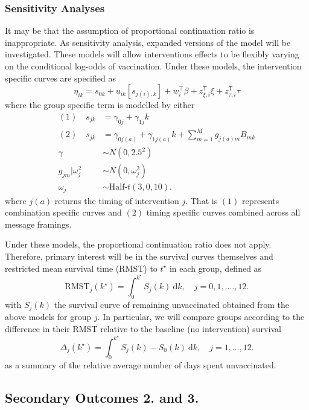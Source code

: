 \documentclass[
  bibliography=totoc]{scrreprt}
\begin{document}
\hypertarget{sensitivity-analyses}{%
\subsubsection{Sensitivity Analyses}\label{sensitivity-analyses}}

It may be that the assumption of proportional continuation ratio is inappropriate.
As sensitivity analysis, expanded versions of the model will be investigated.
These models will allow interventions effects to be flexibly varying on the conditional log-odds of vaccination.
Under these models, the intervention specific curves are specified as
\[
\eta_{ik} = s_{0k} + u_{ik}\left[s_{j(i),k}\right] + w_i^\top\beta + z^\mathsf{T}_{\xi,i}\xi + z^\mathsf{T}_{\tau,i}\tau
\]
where the group specific term is modelled by either
\[
\begin{aligned}
(1)\quad s_{jk} &= \gamma_{0j} + \gamma_{1j}k \\
(2)\quad s_{jk} &= \gamma_{0j(a)} + \gamma_{1j(a)}k + \textstyle\sum_{m=1}^M g_{j(a)m} B_{mk} \\
\gamma &\sim N(0,2.5^2) \\
g_{jm}|\omega_j^2 &\sim N(0, \omega_j^2) \\
\omega_j &\sim \text{Half-}t(3, 0, 10).
\end{aligned}
\]
where \(j(a)\) returns the timing of intervention \(j\).
That is \((1)\) represents combination specific curves and \((2)\) timing specific curves combined across all message framings.

Under these models, the proportional continuation ratio does not apply.
Therefore, primary interest will be in the survival curves themselves and restricted mean survival time (RMST) \citep{royston2011, royston2013} to \(t^\star\) in each group, defined as
\[
\text{RMST}_j(k^\star) = \int_0^{k^\star} S_j(k)\ \mathrm dk,\quad j=0,1,....,12.
\]
with \(S_j(k)\) the survival curve of remaining unvaccinated obtained from the above models for group \(j\).
In particular, we will compare groups according to the difference in their RMST relative to the baseline (no intervention) survival
\[
\Delta_j(k^\star) = \int_0^{k^\star} S_j(k) - S_0(k)\ \mathrm dk,\quad j=1,...,12.
\]
as a summary of the relative average number of days spent unvaccinated.

\hypertarget{secondary-outcomes-2.-and-3.}{%
\subsection{Secondary Outcomes 2. and 3.}\label{secondary-outcomes-2.-and-3.}}
\end{document}
